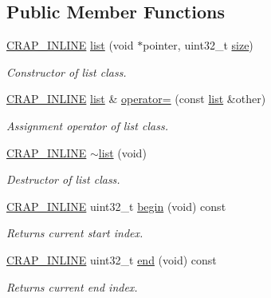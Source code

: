 \subsection*{Public Member Functions}
\begin{DoxyCompactItemize}
\item 
\hyperlink{config__x86_8h_a5a40526b8d842e7ff731509998bb0f1c}{C\+R\+A\+P\+\_\+\+I\+N\+L\+I\+N\+E} \hyperlink{classcrap_1_1list_a2bc0befe212c391e2bd0a2da33f2b8af}{list} (void $\ast$pointer, uint32\+\_\+t \hyperlink{classcrap_1_1list_a43bed0e21b4168ab1d03bd4f15e5ef39}{size})
\begin{DoxyCompactList}\small\item\em Constructor of list class. \end{DoxyCompactList}\item 
\hyperlink{config__x86_8h_a5a40526b8d842e7ff731509998bb0f1c}{C\+R\+A\+P\+\_\+\+I\+N\+L\+I\+N\+E} \hyperlink{classcrap_1_1list}{list} \& \hyperlink{classcrap_1_1list_a58adc5e0fede322174f6d702fc7f4269}{operator=} (const \hyperlink{classcrap_1_1list}{list} \&other)
\begin{DoxyCompactList}\small\item\em Assignment operator of list class. \end{DoxyCompactList}\item 
\hyperlink{config__x86_8h_a5a40526b8d842e7ff731509998bb0f1c}{C\+R\+A\+P\+\_\+\+I\+N\+L\+I\+N\+E} \hyperlink{classcrap_1_1list_aa9af3bd7d01cddf42bebe032f85aa015}{$\sim$list} (void)
\begin{DoxyCompactList}\small\item\em Destructor of list class. \end{DoxyCompactList}\item 
\hyperlink{config__x86_8h_a5a40526b8d842e7ff731509998bb0f1c}{C\+R\+A\+P\+\_\+\+I\+N\+L\+I\+N\+E} uint32\+\_\+t \hyperlink{classcrap_1_1list_a74d83709a5e89b96fb2505a51caf4a57}{begin} (void) const 
\begin{DoxyCompactList}\small\item\em Returns current start index. \end{DoxyCompactList}\item 
\hyperlink{config__x86_8h_a5a40526b8d842e7ff731509998bb0f1c}{C\+R\+A\+P\+\_\+\+I\+N\+L\+I\+N\+E} uint32\+\_\+t \hyperlink{classcrap_1_1list_ac5704b9d8a4f223d792cffbb3f964443}{end} (void) const 
\begin{DoxyCompactList}\small\item\em Returns current end index. \end{DoxyCompactList}\item 

\end{DoxyCompactItemize}

